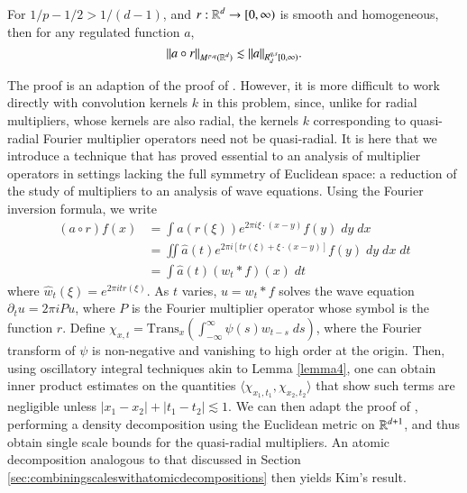 \begin{theorem}
  For $1/p - 1/2 > 1/(d - 1)$, and $r: \operatorname{\mathbb{R}}^d \to [0,\infty)$ is smooth and homogeneous, then for any regulated function $a$,
  \[ \| a \circ r \|_{M^{p,q}(\operatorname{\mathbb{R}}^d)} \lesssim \| a \|_{R^{q,s}_d[0,\infty)}. \]
\end{theorem}

The proof is an adaption of the proof of \cite{HeoandNazarovandSeeger2}. However, it is more difficult to work directly with convolution kernels $k$ in this problem, since, unlike for radial multipliers, whose kernels are also radial, the kernels $k$ corresponding to quasi-radial Fourier multiplier operators need not be quasi-radial. It is here that we introduce a technique that has proved essential to an analysis of multiplier operators in settings lacking the full symmetry of Euclidean space: a reduction of the study of multipliers to an analysis of wave equations. Using the Fourier inversion formula, we write
%
\begin{equation}
\begin{split}
  (a \circ r) f(x) &= \int a(r(\xi)) e^{2 \pi i \xi \cdot (x - y)} f(y)\; dy\; dx\\
  &= \iint \widehat{a}(t) e^{2 \pi i [t r(\xi) + \xi \cdot (x - y)]} f(y)\; dy\; dx\; dt\\
  &= \int \widehat{a}(t) (w_t * f)(x)\; dt
\end{split}
\end{equation}
%
where $\widehat{w}_t(\xi) = e^{2 \pi i t r(\xi)}$. As $t$ varies, $u = w_t * f$ solves the wave equation $\partial_t u = 2 \pi i P u$, where $P$ is the Fourier multiplier operator whose symbol is the function $r$. Define $\chi_{x,t} = \text{Trans}_x \left( \int_{-\infty}^\infty \psi(s) w_{t - s}\; ds \right)$, where the Fourier transform of $\psi$ is non-negative and vanishing to high order at the origin. Then, using oscillatory integral techniques akin to Lemma \ref{lemma4}, one can obtain inner product estimates on the quantities $\langle \chi_{x_1,t_1}, \chi_{x_2,t_2} \rangle$ that show such terms are negligible unless $|x_1 - x_2| + |t_1 - t_2| \lesssim 1$. We can then adapt the proof of \cite{HeoandNazarovandSeeger2}, performing a density decomposition using the Euclidean metric on $\operatorname{\mathbb{R}}^{d+1}$, and thus obtain single scale bounds for the quasi-radial multipliers. An atomic decomposition analogous to that discussed in Section \ref{sec:combiningscaleswithatomicdecompositions} then yields Kim's result.

